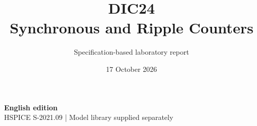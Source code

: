 \documentclass[11pt,a4paper]{article}
\title{\color{accent}DIC24\\[4pt]Synchronous and Ripple Counters}
\author{Specification-based laboratory report}
\date{17 October 2026}
\begin{document}
\maketitle
\begin{center}\small\textbf{English edition}\\
HSPICE S-2021.09 \quad | \quad Model library supplied separately
\end{center}


\end{document}
